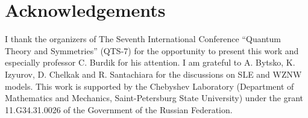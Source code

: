 \conclusion
\label{cha:conclusion1}

\section*{Acknowledgements}
\label{sec:acknowledgements}
I thank the organizers of The Seventh International Conference ``Quantum Theory and Symmetries'' (QTS-7) for the opportunity to present this work and especially professor C. Burdik for his attention. I am grateful to A. Bytsko, K. Izyurov, D. Chelkak and R. Santachiara for the discussions on SLE and WZNW models. This work  is supported by
the Chebyshev Laboratory (Department of Mathematics and Mechanics,
Saint-Petersburg State University) under the grant 11.G34.31.0026
of the Government of the Russian Federation.



